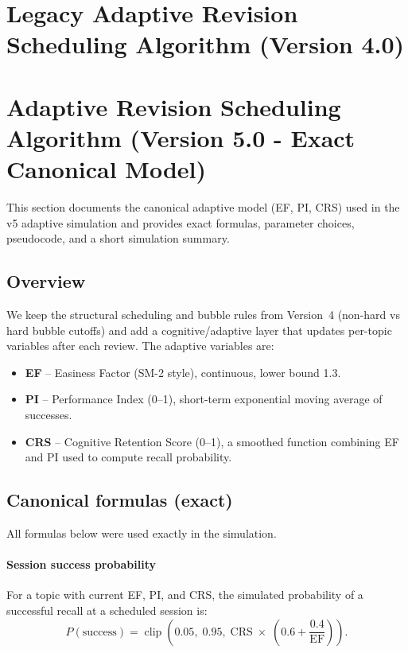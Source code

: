 \documentclass[12pt]{article}
\begin{document}
\section*{Legacy Adaptive Revision Scheduling Algorithm (Version 4.0)}



\section*{Adaptive Revision Scheduling Algorithm (Version 5.0 - Exact Canonical Model)}
\label{sec:v5_adaptive}

This section documents the canonical adaptive model (EF, PI, CRS) used in the v5 adaptive simulation and provides exact formulas, parameter choices, pseudocode, and a short simulation summary.

\subsection*{Overview}
We keep the structural scheduling and bubble rules from Version~4 (non-hard vs hard bubble cutoffs) and add a cognitive/adaptive layer that updates per-topic variables after each review. The adaptive variables are:
\begin{itemize}
  \item \textbf{EF} -- Easiness Factor (SM-2 style), continuous, lower bound 1.3.
  \item \textbf{PI} -- Performance Index (0--1), short-term exponential moving average of successes.
  \item \textbf{CRS} -- Cognitive Retention Score (0--1), a smoothed function combining EF and PI used to compute recall probability.
\end{itemize}

\subsection*{Canonical formulas (exact)}
All formulas below were used exactly in the simulation.

\paragraph{Session success probability}
For a topic with current EF, PI, and CRS, the simulated probability of a successful recall at a scheduled session is:
\begin{equation}
P(\text{success}) = \operatorname{clip}\left(0.05,\;0.95,\; \text{CRS}\;\times\;\left(0.6 + \frac{0.4}{\text{EF}}\right) \right).
\end{equation}
\end{document}
